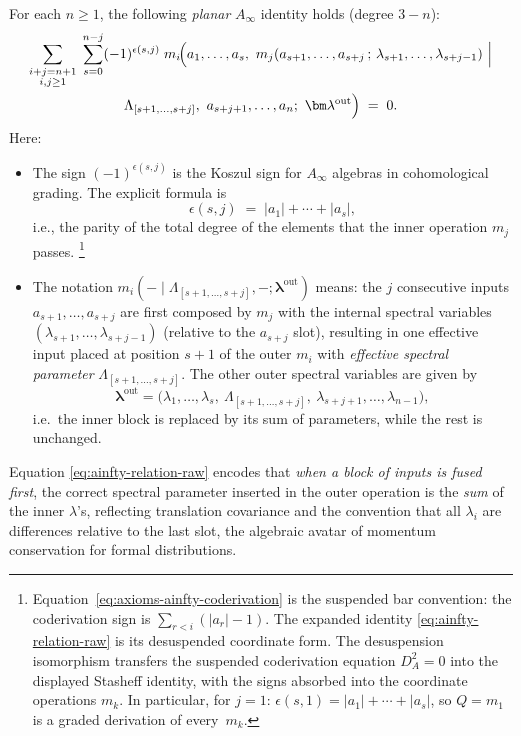 \begin{definition}
\label{def:ainfty-relations}
For each $n\ge 1$, the following \emph{planar} $A_\infty$ identity holds (degree $3-n$):
\begin{multline}
\label{eq:ainfty-relation-raw}
\sum_{\substack{i+j=n+1\\ i,j\ge1}}\;\sum_{s=0}^{n-j}
(-1)^{\epsilon(s,j)}\;
m_i\!\Bigl(
a_1,\dots,a_s,\
m_j(a_{s+1},\dots,a_{s+j}\,;\,\lambda_{s+1},\dots,\lambda_{s+j-1})
\ \Big|\\
\Lambda_{[s+1,\dots,s+j]}
,\ a_{s+j+1},\dots,a_n;\ \bm\lambda^{\mathrm{out}} \Bigr)
\;=\;0.
\end{multline}
Here:
\begin{itemize}
 \item The sign $(-1)^{\epsilon(s,j)}$ is the Koszul sign for $A_\infty$ algebras in cohomological grading. The explicit formula is
 \[
 \epsilon(s,j) \;=\; |a_1|+\cdots+|a_s|,
 \]
 i.e., the parity of the total degree of the elements that the inner operation $m_j$ passes.%
 \footnote{Equation~\eqref{eq:axioms-ainfty-coderivation} is the
 suspended bar convention: the coderivation sign is
 $\sum_{r<i}(|a_r|-1)$. The expanded identity
 \eqref{eq:ainfty-relation-raw} is its desuspended coordinate form.
 The desuspension isomorphism transfers the suspended coderivation
 equation $D_A^2=0$ into the displayed Stasheff identity, with the
 signs absorbed into the coordinate operations $m_k$.
 In particular, for $j=1$: $\epsilon(s,1)=|a_1|+\cdots+|a_s|$,
 so $Q=m_1$ is a graded derivation of every~$m_k$.}
 \item The notation $m_i(-\mid \Lambda_{[s+1,\dots,s+j]},-;\bm\lambda^{\mathrm{out}})$ means:
 the $j$ consecutive inputs $a_{s+1},\dots,a_{s+j}$ are first composed by $m_j$ with the internal spectral variables $(\lambda_{s+1},\dots,\lambda_{s+j-1})$ (relative to the $a_{s+j}$ slot), resulting in one effective input placed at position $s+1$ of the outer $m_i$ with \emph{effective spectral parameter} $\Lambda_{[s+1,\dots,s+j]}$. The other outer spectral variables are given by
 \[
 \bm\lambda^{\mathrm{out}} = \bigl(\lambda_1,\dots,\lambda_s,\ \Lambda_{[s+1,\dots,s+j]},\ \lambda_{s+j+1},\dots,\lambda_{n-1}\bigr),
 \]
 i.e.\ the inner block is replaced by its sum of parameters, while the rest is unchanged.
\end{itemize}
\begin{remark}
\label{rmk:spectral-substitution}
Equation \eqref{eq:ainfty-relation-raw} encodes that \emph{when a block of inputs is fused first}, the correct spectral parameter inserted in the outer operation is the \emph{sum} of the inner $\lambda$'s, reflecting translation covariance and the convention that all $\lambda_i$ are differences relative to the last slot, the algebraic avatar of momentum conservation for formal distributions.
\end{remark}
\end{definition}

